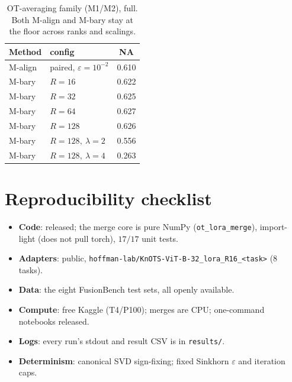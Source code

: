 \documentclass[11pt]{article}
\begin{document}
\begin{table}[h]
\centering
\caption{OT-averaging family (M1/M2), full. Both M-align and M-bary stay at the floor across ranks and
scalings.}
\label{tab:avgfull}
\small
\begin{tabular}{llc}
\toprule
Method & config & NA \\
\midrule
M-align & paired, $\varepsilon{=}10^{-2}$ & 0.610 \\
M-bary & $R{=}16$ & 0.622 \\
M-bary & $R{=}32$ & 0.625 \\
M-bary & $R{=}64$ & 0.627 \\
M-bary & $R{=}128$ & 0.626 \\
M-bary & $R{=}128,\ \lambda{=}2$ & 0.556 \\
M-bary & $R{=}128,\ \lambda{=}4$ & 0.263 \\
\bottomrule
\end{tabular}
\end{table}

\section{Reproducibility checklist}
\label{app:repro}
\begin{itemize}[leftmargin=1.4em,itemsep=2pt]
\item \textbf{Code}: released; the merge core is pure NumPy (\texttt{ot\_lora\_merge}), import-light
(does not pull torch), $17/17$ unit tests.
\item \textbf{Adapters}: public, \texttt{hoffman-lab/KnOTS-ViT-B-32\_lora\_R16\_<task>} (8 tasks).
\item \textbf{Data}: the eight FusionBench test sets, all openly available.
\item \textbf{Compute}: free Kaggle (T4/P100); merges are CPU; one-command notebooks released.
\item \textbf{Logs}: every run's stdout and result CSV is in \texttt{results/}.
\item \textbf{Determinism}: canonical SVD sign-fixing; fixed Sinkhorn $\varepsilon$ and iteration caps.
\end{itemize}
\end{document}
